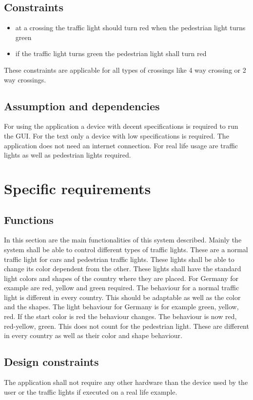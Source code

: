\documentclass[a4paper]{report}
\begin{document}
\section{Constraints}
\begin{itemize}
    \item at a crossing the traffic light should turn red when the pedestrian light turns green
    \item if the traffic light turns green the pedestrian light shall turn red
\end{itemize}
These constraints are applicable for all types of crossings like 4 way crossing or 2 way crossings.

\section{Assumption and dependencies}
For using the application a device with decent specifications is required to run the GUI. For the text only a device with low specifications is required. The application does not need an internet connection. For real life usage are traffic lights as well as pedestrian lights required.

\chapter{Specific requirements}

\section{Functions}
In this section are the main functionalities of this system described.
Mainly the system shall be able to control different types of traffic lights. These are a normal traffic light for cars and pedestrian traffic lights. These lights shall be able to change its color dependent from the other. These lights shall have the standard light colors and shapes of the country where they are placed. For Germany for example are red, yellow and green required. The behaviour for a normal traffic light is different in every country. This should be adaptable as well as the color and the shapes. The light behaviour for Germany is for example green, yellow, red. If the start color is red the behaviour changes. The behaviour is now red, red-yellow, green. This does not count for the pedestrian light. These are different in every country as well as their color and shape behaviour.

\section{Design constraints}
The application shall not require any other hardware than the device used by the user or the traffic lights if executed on a real life example. 
\end{document}
